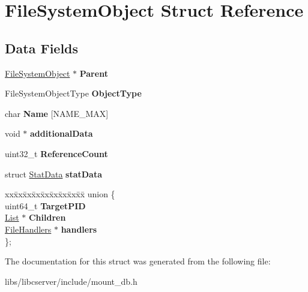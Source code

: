 \hypertarget{structFileSystemObject}{}\section{File\+System\+Object Struct Reference}
\label{structFileSystemObject}
\subsection*{Data Fields}
\begin{DoxyCompactItemize}
\item 
\hyperlink{structFileSystemObject}{File\+System\+Object} $\ast$ {\bfseries Parent}\hypertarget{structFileSystemObject_a1a67e0d2897c6d673e263bca809ddeba}{}\label{structFileSystemObject_a1a67e0d2897c6d673e263bca809ddeba}

\item 
File\+System\+Object\+Type {\bfseries Object\+Type}\hypertarget{structFileSystemObject_ab55c9fc2c37db13ae8ebe9c60d4a1d43}{}\label{structFileSystemObject_ab55c9fc2c37db13ae8ebe9c60d4a1d43}

\item 
char {\bfseries Name} \mbox{[}N\+A\+M\+E\+\_\+\+M\+AX\mbox{]}\hypertarget{structFileSystemObject_a2122626421ad3028804a5b709d4b1603}{}\label{structFileSystemObject_a2122626421ad3028804a5b709d4b1603}

\item 
void $\ast$ {\bfseries additional\+Data}\hypertarget{structFileSystemObject_a6ee90631e65fca4731f2745e67ea6096}{}\label{structFileSystemObject_a6ee90631e65fca4731f2745e67ea6096}

\item 
uint32\+\_\+t {\bfseries Reference\+Count}\hypertarget{structFileSystemObject_a4e38002faad09967de58f32f9571319e}{}\label{structFileSystemObject_a4e38002faad09967de58f32f9571319e}

\item 
struct \hyperlink{structStatData}{Stat\+Data} {\bfseries stat\+Data}\hypertarget{structFileSystemObject_a1eed4a89f2bdf4f26d5dde8f4d492eec}{}\label{structFileSystemObject_a1eed4a89f2bdf4f26d5dde8f4d492eec}

\item 
\begin{tabbing}
xx\=xx\=xx\=xx\=xx\=xx\=xx\=xx\=xx\=\kill
union \{\\
\>uint64\_t {\bfseries TargetPID}\\
\>\hyperlink{structList}{List} $\ast$ {\bfseries Children}\\
\>\hyperlink{structFileHandlers}{FileHandlers} $\ast$ {\bfseries handlers}\\
\}; \hypertarget{structFileSystemObject_a085fc13145f9c8ea21b00028c9e4054a}{}\label{structFileSystemObject_a085fc13145f9c8ea21b00028c9e4054a}
\\

\end{tabbing}\end{DoxyCompactItemize}


The documentation for this struct was generated from the following file\+:\begin{DoxyCompactItemize}
\item 
libs/libcserver/include/mount\+\_\+db.\+h\end{DoxyCompactItemize}

